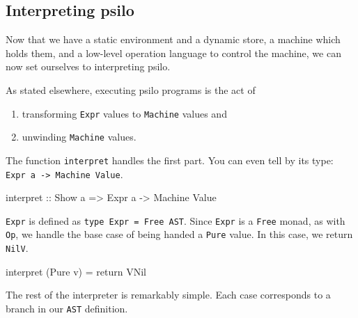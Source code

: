 \documentclass[]{article}
\newenvironment{Shaded}{}{}
\newcommand{\DataTypeTok}[1]{\textcolor[rgb]{0.56,0.13,0.00}{{#1}}}
\newcommand{\OtherTok}[1]{\textcolor[rgb]{0.00,0.44,0.13}{{#1}}}
\newcommand{\FunctionTok}[1]{\textcolor[rgb]{0.02,0.16,0.49}{{#1}}}
\newcommand{\NormalTok}[1]{{#1}}
\begin{document}
\subsection{Interpreting psilo}\label{interpreting-psilo}

Now that we have a static environment and a dynamic store, a machine
which holds them, and a low-level operation language to control the
machine, we can now set ourselves to interpreting psilo.

As stated elsewhere, executing psilo programs is the act of

\begin{enumerate}
\def\labelenumi{\arabic{enumi}.}
\itemsep1pt\parskip0pt
\item
  transforming \texttt{Expr} values to \texttt{Machine} values and
\item
  unwinding \texttt{Machine} values.
\end{enumerate}

The function \texttt{interpret} handles the first part. You can even
tell by its type: \texttt{Expr a -\textgreater{} Machine Value}.

\begin{Shaded}
\begin{Highlighting}[]
\OtherTok{interpret ::} \DataTypeTok{Show} \NormalTok{a }\OtherTok{=>} \DataTypeTok{Expr} \NormalTok{a }\OtherTok{->} \DataTypeTok{Machine} \DataTypeTok{Value}
\end{Highlighting}
\end{Shaded}

\texttt{Expr} is defined as \texttt{type Expr = Free AST}. Since
\texttt{Expr} is a \texttt{Free} monad, as with \texttt{Op}, we handle
the base case of being handed a \texttt{Pure} value. In this case, we
return \texttt{NilV}.

\begin{Shaded}
\begin{Highlighting}[]
\NormalTok{interpret (}\DataTypeTok{Pure} \NormalTok{v) }\FunctionTok{=} \NormalTok{return }\DataTypeTok{VNil}
\end{Highlighting}
\end{Shaded}

The rest of the interpreter is remarkably simple. Each case corresponds
to a branch in our \texttt{AST} definition.

\begin{Shaded}
\end{Shaded}
\end{document}
